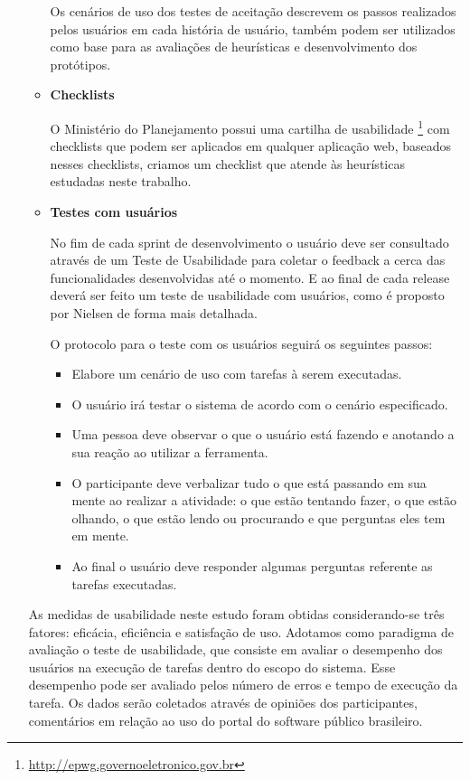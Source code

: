 \begin{enumerate}
\begin{itemize}
		Os cenários de uso dos testes de aceitação descrevem os passos realizados pelos usuários em cada história de usuário, também podem ser utilizados como base para as avaliações de heurísticas e desenvolvimento dos protótipos.

		\item \textbf{Checklists}

		O Ministério do Planejamento possui uma cartilha de usabilidade \footnote{\url{http://epwg.governoeletronico.gov.br}} com checklists que podem ser aplicados em qualquer aplicação web, baseados nesses checklists, criamos um checklist que atende às heurísticas estudadas neste trabalho.

	\item \textbf{Testes com usuários}
		
		No fim de cada sprint de desenvolvimento o usuário deve ser consultado através de um Teste de Usabilidade para coletar o feedback a cerca das funcionalidades desenvolvidas até o momento. E ao final de cada release deverá ser feito um teste de usabilidade com usuários, como é proposto por Nielsen de forma mais detalhada.
		
		O protocolo para o teste com os usuários seguirá os seguintes passos:
	
		\begin{itemize}

		\item Elabore um cenário de uso com tarefas à serem executadas.
		\item O usuário irá testar o sistema de acordo com o cenário especificado.
		\item Uma pessoa deve observar o que o usuário está fazendo e anotando a sua reação ao utilizar a ferramenta.
		\item O participante deve verbalizar tudo o que está passando em sua mente ao realizar a atividade: o que estão tentando fazer, o que estão olhando, o que estão lendo ou procurando e que perguntas eles tem em mente.		
		\item Ao final o usuário deve responder algumas perguntas referente as tarefas executadas.

		\end{itemize}
				
	\end{itemize} 
	
	As medidas de usabilidade neste estudo foram obtidas considerando-se três fatores: eficácia, eficiência e satisfação de uso. 
	Adotamos como paradigma de avaliação o teste de usabilidade, que consiste em avaliar o desempenho dos usuários na execução de tarefas dentro do escopo do sistema. Esse desempenho pode ser avaliado pelos número de erros e tempo de execução da tarefa. Os dados serão coletados através de opiniões dos participantes, comentários em relação ao uso do portal do software público brasileiro.
	


\end{enumerate}
